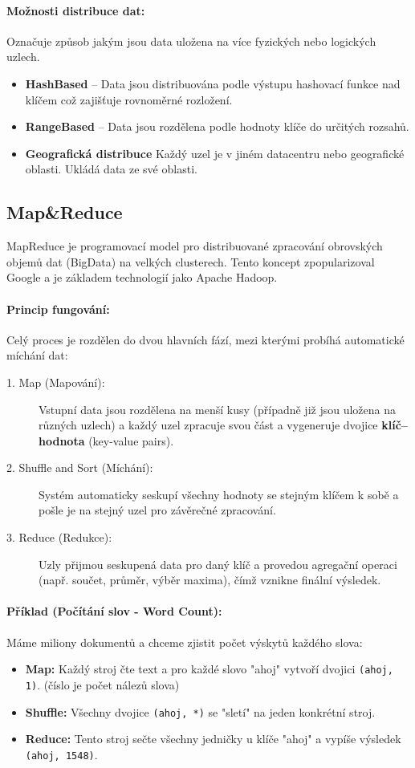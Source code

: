\paragraph*{Možnosti distribuce dat:}
Označuje způsob jakým jsou data uložena na více fyzických nebo logických uzlech.
\begin{itemize}
    \item \textbf{HashBased} -- Data jsou distribuována podle výstupu hashovací funkce nad klíčem což zajišťuje rovnoměrné rozložení.
    \item \textbf{RangeBased} -- Data jsou rozdělena podle hodnoty klíče do určitých rozsahů.
    \item \textbf{Geografická distribuce} Každý uzel je v jiném datacentru nebo geografické oblasti. Ukládá data ze své oblasti.
\end{itemize}

\subsection{Map\&Reduce}
MapReduce je programovací model pro distribuované zpracování obrovských objemů dat (BigData) na velkých clusterech. Tento koncept zpopularizoval Google a je základem technologií jako Apache Hadoop.

\paragraph*{Princip fungování:}
Celý proces je rozdělen do dvou hlavních fází, mezi kterými probíhá automatické míchání dat:

\begin{description}
    \item[1. Map (Mapování):] Vstupní data jsou rozdělena na menší kusy (případně již jsou uložena na různých uzlech) a každý uzel zpracuje svou část a vygeneruje dvojice \textbf{klíč–hodnota} (key-value pairs).
    \item[2. Shuffle and Sort (Míchání):] Systém automaticky seskupí všechny hodnoty se stejným klíčem k sobě a pošle je na stejný uzel pro závěrečné zpracování.
    \item[3. Reduce (Redukce):] Uzly přijmou seskupená data pro daný klíč a provedou agregační operaci (např. součet, průměr, výběr maxima), čímž vznikne finální výsledek.
\end{description}

\paragraph*{Příklad (Počítání slov - Word Count):}
Máme miliony dokumentů a chceme zjistit počet výskytů každého slova:
\begin{itemize}
    \item \textbf{Map:} Každý stroj čte text a pro každé slovo "ahoj" vytvoří dvojici \texttt{(ahoj, 1)}. (číslo je počet nálezů slova)
    \item \textbf{Shuffle:} Všechny dvojice \texttt{(ahoj, *)} se "sletí" na jeden konkrétní stroj.
    \item \textbf{Reduce:} Tento stroj sečte všechny jedničky u klíče "ahoj" a vypíše výsledek \texttt{(ahoj, 1548)}.
\end{itemize}

